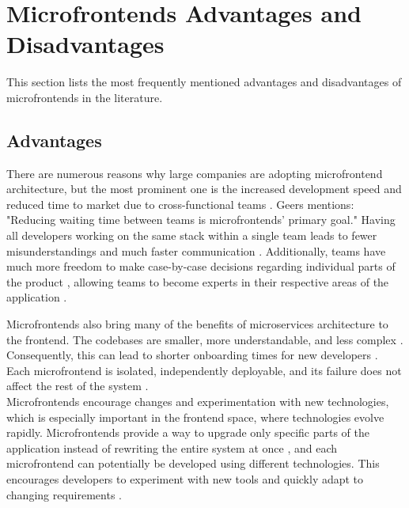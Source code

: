 \section{Microfrontends Advantages and Disadvantages}
This section lists the most frequently mentioned advantages and disadvantages of microfrontends in the literature.

\subsection{Advantages}
There are numerous reasons why large companies are adopting microfrontend architecture, but the most prominent one is the increased development speed and reduced time to market due to cross-functional teams \cite{Geers}\cite{Montelius}\cite{Peltonen}. Geers \cite{Geers} mentions: "Reducing waiting time between teams is microfrontends' primary goal." Having all developers working on the same stack within a single team leads to fewer misunderstandings and much faster communication \cite{Geers}\cite{Montelius}. Additionally, teams have much more freedom to make case-by-case decisions regarding individual parts of the product \cite{Jackson}\cite{Geers}, allowing teams to become experts in their respective areas of the application \cite{Montelius}.

\noindent
Microfrontends also bring many of the benefits of microservices architecture to the frontend. The codebases are smaller, more understandable, and less complex \cite{Geers}\cite{Jackson}\cite{Montelius}. Consequently, this can lead to shorter onboarding times for new developers \cite{Peltonen}. Each microfrontend is isolated, independently deployable, and its failure does not affect the rest of the system \cite{Peltonen}\cite{Montelius}\cite{Jackson}\cite{Geers}.\\

\noindent
Microfrontends encourage changes and experimentation with new technologies, which is especially important in the frontend space, where technologies evolve rapidly. Microfrontends provide a way to upgrade only specific parts of the application instead of rewriting the entire system at once \cite{Jackson}\cite{Montelius}, and each microfrontend can potentially be developed using different technologies. This encourages developers to experiment with new tools and quickly adapt to changing requirements \cite{Peltonen}.


